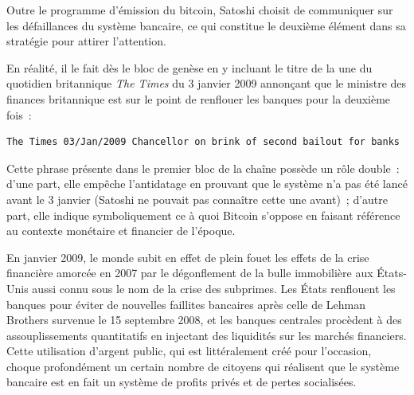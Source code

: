 

Outre le programme d'émission du bitcoin, Satoshi choisit de communiquer sur les défaillances du système bancaire, ce qui constitue le deuxième élément dans sa stratégie pour attirer l'attention.

En réalité, il le fait dès le bloc de genèse en y incluant le titre de la une du quotidien britannique \emph{The Times} du 3 janvier 2009 annonçant que le ministre des finances britannique est sur le point de renflouer les banques pour la deuxième fois~:

\begin{Verbatim}[fontsize=\small]
The Times 03/Jan/2009 Chancellor on brink of second bailout for banks
\end{Verbatim}

Cette phrase présente dans le premier bloc de la chaîne possède un rôle double~: d'une part, elle empêche l'antidatage en prouvant que le système n'a pas été lancé avant le 3 janvier (Satoshi ne pouvait pas connaître cette une avant)~; d'autre part, elle indique symboliquement ce à quoi Bitcoin s'oppose en faisant référence au contexte monétaire et financier de l'époque.

En janvier 2009, le monde subit en effet de plein fouet les effets de la crise financière amorcée en 2007 par le dégonflement de la bulle immobilière aux États-Unis aussi connu sous le nom de la crise des subprimes. Les États renflouent les banques pour éviter de nouvelles faillites bancaires après celle de Lehman Brothers survenue le 15 septembre 2008, et les banques centrales procèdent à des assouplissements quantitatifs en injectant des liquidités sur les marchés financiers. Cette utilisation d'argent public, qui est littéralement créé pour l'occasion, choque profondément un certain nombre de citoyens qui réalisent que le système bancaire est en fait un système de profits privés et de pertes socialisées.


